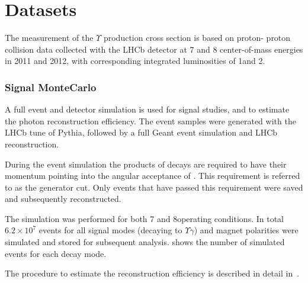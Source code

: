 \section{Datasets}
\label{sec:datasets}

The measurement of the $\Upsilon$ production cross section is based on proton-
proton collision data collected with the LHCb detector at 7 and 8\tev
center-of-mass energies in 2011 and 2012, with corresponding integrated luminosities
of 1\invfb and 2\invfb.

\subsubsection{Signal MonteCarlo}

A full event and detector simulation is used for signal studies, and to
estimate the photon reconstruction efficiency. The event samples were
generated with the LHCb tune of Pythia\cite{LHCb-PROC-2010-056}, followed by a
full Geant\cite{Allison:2006ve} event simulation and LHCb reconstruction.

During the event simulation the products of \chib decays are required
to have their momentum pointing into the angular acceptance of \lhcb. This
requirement is referred to as the generator cut. Only events that have passed this
requirement were saved and subsequently reconstructed.

The simulation was performed for both 7 and 8\tev operating conditions. In
total $6.2\times10^7$ events for all signal modes (\chib decaying to $\Upsilon
\gamma$) and magnet polarities were simulated and stored for subsequent
analysis.  shows the number of simulated events for each decay
mode.




The procedure to estimate the
reconstruction efficiency is described in detail in~.

